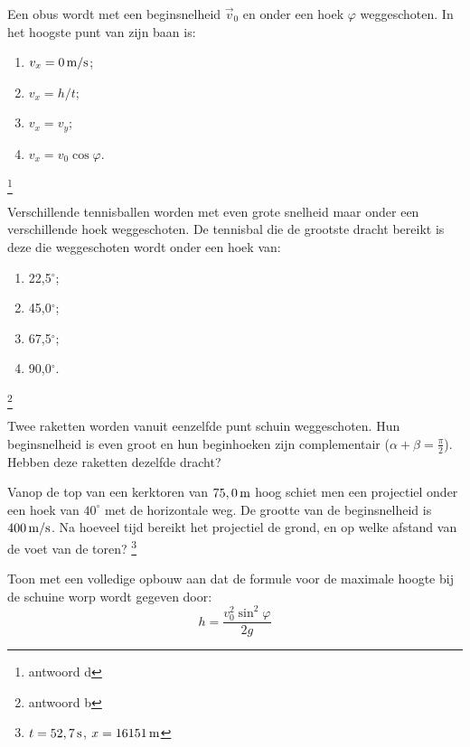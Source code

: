 \begin{exercise} Een obus wordt met een beginsnelheid $\vec{v}_0$ en onder een
hoek $\varphi$ weggeschoten. In het hoogste punt van zijn baan is:
\begin{enumerate}
\item $v_x=0\rm\,m/s$;
\item $v_x=h/t$;
\item $v_x=v_y$;
\item $v_x=v_0\cos{\varphi}$.
\end{enumerate}
\footnote{antwoord d}

\end{exercise}

\begin{exercise} Verschillende tennisballen worden met even grote snelheid maar
onder een verschillende hoek weggeschoten. De tennisbal die de
grootste dracht bereikt is deze die weggeschoten wordt onder een
hoek van:
\begin{enumerate}
\item 22,5$^\circ$;
\item 45,0$^\circ$;
\item 67,5$^\circ$;
\item 90,0$^\circ$.
\end{enumerate}
\footnote{antwoord b}

\end{exercise}

\begin{exercise} Twee raketten worden vanuit eenzelfde punt schuin
weggeschoten. Hun beginsnelheid is even groot en hun beginhoeken
zijn complementair ($\alpha+\beta=\frac{\pi}{2}$). Hebben deze
raketten dezelfde dracht?

\end{exercise}

\begin{exercise} Vanop de top van een kerktoren van $75,0\rm\,m$ hoog schiet
men een projectiel onder een hoek van $40^\circ$ met de horizontale
weg. De grootte van de beginsnelheid is $400\rm\,m/s$. Na hoeveel
tijd bereikt het projectiel de grond, en op welke afstand van de
voet van de toren? \footnote{$t=52,7\rm\,s$, $x=16151\rm\,m$}

\end{exercise}

\begin{exercise} Toon met een volledige opbouw aan dat de formule voor de
maximale hoogte bij de schuine worp wordt gegeven door:
\begin{displaymath}
h=\frac{v_0^2\sin^2{\varphi}}{2g}
\end{displaymath}

\end{exercise}

